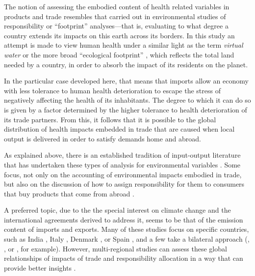 \documentclass[a4paper,12pt]{article}
\begin{document}
The notion of assessing the embodied content of health related variables in products and trade resembles that carried out in environmental studies of responsibility or ``footprint'' analyses---that is, evaluating to what degree a country extends its impacts on this earth across its borders. In this study an attempt is made to view human health under a similar light as the term \textit{virtual water} \citep{allanvirtual2003} or the more broad ``ecological footprint'' \citep{reesrevisiting1996,wackernagelour1996}, which reflects the total land needed by a country, in order to absorb the impact of its residents on the planet.

In the particular case developed here, that means that imports allow an economy with less tolerance to human health deterioration to escape the stress of negatively affecting the health of its inhabitants. The degree to which it can do so is given by a factor determined by the higher tolerance to health deterioration of its trade partners. From this, it follows that it is possible to the global distribution of health impacts embedded in trade that are caused when local output is delivered in order to satisfy demands home and abroad.

As explained above, there is an established tradition of input-output literature that has undertaken these types of analysis for environmental variables \citep{wiedmannexamining2007}. Some focus, not only on the accounting of environmental impacts embodied in trade, but also on the discussion of how to assign responsibility for them to consumers that buy products that come from abroad \citep{steengeinputoutput1999,munksgaardco22001,gallegoconsistent2005,rodriguesdesigning2006,lenzenshared2007,rodriguesconsumer2008}. 

A preferred topic, due to the the special interest on climate change and the international agreements derived to address it, seems to be that of the emission content of imports and exports. Many of these studies focus on specific countries, such as India 
\citep{dietzenbacherempirical2007}, Italy \citep{mongelliglobal2006}, Denmark \citep{munksgaardco22001}, or Spain  
\citep{sanchezcholizco22004,serranodietz2010}, and a few take a bilateral approach (\citealp{rheechange2006}, \citealp{ackermancarbon2007}, or \citealp{normaneconomic2007}, for example). However, multi-regional studies can assess these global relationships of impacts of trade and responsibility allocation in a way that can provide better insights \citep{wiedmannallocating2006,turnerexamining2007}.
\end{document}
